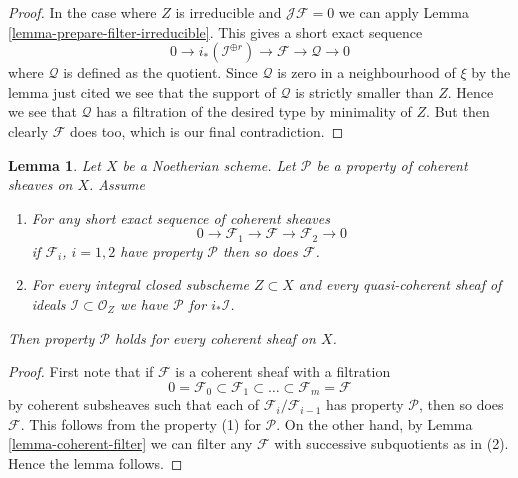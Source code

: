 \documentclass{stacks-project}
\theoremstyle{plain}
\newtheorem{lemma}[subsection]{Lemma}
\theoremstyle{definition}
\theoremstyle{remark}
\numberwithin{equation}{subsection}
\begin{document}
\begin{proof}
\medskip\noindent
In the case where $Z$ is irreducible and $\mathcal{J}\mathcal{F} = 0$
we can apply Lemma \ref{lemma-prepare-filter-irreducible}.
This gives a short exact sequence
$$
0 \to
i_*(\mathcal{I}^{\oplus r}) \to
\mathcal{F} \to
\mathcal{Q} \to 0
$$
where $\mathcal{Q}$ is defined as the quotient.
Since $\mathcal{Q}$ is zero in a neighbourhood of $\xi$ by
the lemma just cited we see that the support of $\mathcal{Q}$
is strictly smaller than $Z$. Hence we see that $\mathcal{Q}$
has a filtration of the desired type by minimality of $Z$.
But then clearly $\mathcal{F}$ does too, which is our final contradiction.
\end{proof}

\begin{lemma}
\label{lemma-property-initial}
Let $X$ be a Noetherian scheme.
Let $\mathcal{P}$ be a property of coherent sheaves on $X$. Assume
\begin{enumerate}
\item For any short exact sequence of coherent sheaves
$$
0 \to \mathcal{F}_1 \to \mathcal{F} \to \mathcal{F}_2 \to 0
$$
if $\mathcal{F}_i$, $i = 1, 2$ have property $\mathcal{P}$
then so does $\mathcal{F}$.
\item For every integral closed subscheme $Z \subset X$
and every quasi-coherent sheaf of ideals
$\mathcal{I} \subset \mathcal{O}_Z$ we have
$\mathcal{P}$ for $i_*\mathcal{I}$.
\end{enumerate}
Then property $\mathcal{P}$ holds for every coherent sheaf
on $X$.
\end{lemma}

\begin{proof}
First note that if $\mathcal{F}$ is a coherent sheaf with a filtration
$$
0 = \mathcal{F}_0 \subset \mathcal{F}_1 \subset
\ldots \subset \mathcal{F}_m = \mathcal{F}
$$
by coherent subsheaves such that each of $\mathcal{F}_i/\mathcal{F}_{i - 1}$
has property $\mathcal{P}$, then so does $\mathcal{F}$.
This follows from the property (1) for $\mathcal{P}$.
On the other hand, by Lemma \ref{lemma-coherent-filter}
we can filter any $\mathcal{F}$
with successive subquotients as in (2).
Hence the lemma follows.
\end{proof}
\end{document}
